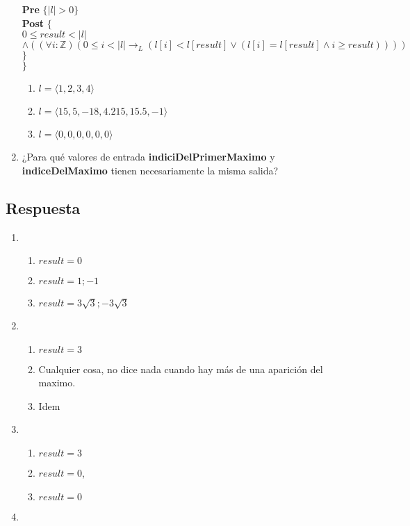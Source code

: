 \documentclass[a4paper]{article}
\begin{document}
\begin{enumerate}[label=\alph*)]
			\hspace*{6mm} \textbf{Pre }$\{ |l| > 0\}$\smallskip \\
			\hspace*{6mm} \textbf{Post }$\{$\\
			\hspace*{6mm} $0\leq result < |l|$\\
			\hspace*{6mm} $\wedge ((\forall i :\mathbb{Z})(0 \leq i < |l|\rightarrow_L (l[i] < l[result] \vee (l[i]=l[result]\wedge i \geq result))))$\\
			\hspace*{6mm}$\}$\\
			$\}$
			\begin{enumerate}[label=\Roman*)]
				\item $l=\langle 1,2,3,4\rangle$
				\item $l=\langle 15,5,-18,4.215,15.5,-1\rangle$
				\item $l=\langle 0,0,0,0,0,0\rangle$
			\end{enumerate}
		\item  ¿Para qué valores de entrada \textbf{indiciDelPrimerMaximo} y \textbf{indiceDelMaximo} tienen necesariamente la misma salida?
	\end{enumerate}
\subsection*{Respuesta}
	\begin{enumerate}[label=\alph*)]
		\item
			\begin{enumerate}[label=\Roman*)]
				\item $result=0$
				\item $result=1;-1$
				\item $result=3\sqrt{3};-3\sqrt{3}$
			\end{enumerate}
		\item
			\begin{enumerate}[label=\Roman*)]
				\item $result=3$
				\item Cualquier cosa, no dice nada cuando hay más de una aparición
						del maximo.
				\item Idem
			\end{enumerate}
		\item
			\begin{enumerate}[label=\Roman*)]
				\item $result=3$
				\item $result=0$, 
				\item $result=0$
			\end{enumerate}
		\item 
	\end{enumerate}
	
\end{document}
